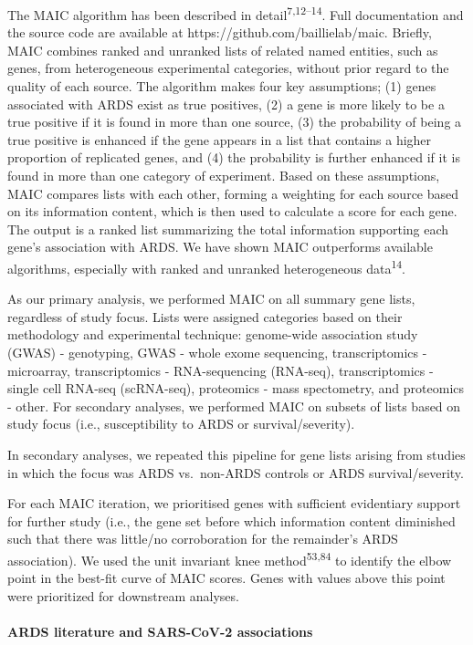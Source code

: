 \documentclass[
  11,
  a4paper,
]{article}
\let\oldparagraph\paragraph
\renewcommand{\paragraph}[1]{\oldparagraph{#1}\mbox{}}
\begin{document}
The MAIC algorithm has been described in
detail\textsuperscript{7,12--14}. Full documentation and the source code
are available at https://github.com/baillielab/maic. Briefly, MAIC
combines ranked and unranked lists of related named entities, such as
genes, from heterogeneous experimental categories, without prior regard
to the quality of each source. The algorithm makes four key assumptions;
(1) genes associated with ARDS exist as true positives, (2) a gene is
more likely to be a true positive if it is found in more than one
source, (3) the probability of being a true positive is enhanced if the
gene appears in a list that contains a higher proportion of replicated
genes, and (4) the probability is further enhanced if it is found in
more than one category of experiment. Based on these assumptions, MAIC
compares lists with each other, forming a weighting for each source
based on its information content, which is then used to calculate a
score for each gene. The output is a ranked list summarizing the total
information supporting each gene's association with ARDS. We have shown
MAIC outperforms available algorithms, especially with ranked and
unranked heterogeneous data\textsuperscript{14}.

As our primary analysis, we performed MAIC on all summary gene lists,
regardless of study focus. Lists were assigned categories based on their
methodology and experimental technique: genome-wide association study
(GWAS) - genotyping, GWAS - whole exome sequencing, transcriptomics -
microarray, transcriptomics - RNA-sequencing (RNA-seq), transcriptomics
- single cell RNA-seq (scRNA-seq), proteomics - mass spectometry, and
proteomics - other. For secondary analyses, we performed MAIC on subsets
of lists based on study focus (i.e., susceptibility to ARDS or
survival/severity).

In secondary analyses, we repeated this pipeline for gene lists arising
from studies in which the focus was ARDS vs.~non-ARDS controls or ARDS
survival/severity.

For each MAIC iteration, we prioritised genes with sufficient
evidentiary support for further study (i.e., the gene set before which
information content diminished such that there was little/no
corroboration for the remainder's ARDS association). We used the unit
invariant knee method\textsuperscript{53,84} to identify the elbow point
in the best-fit curve of MAIC scores. Genes with values above this point
were prioritized for downstream analyses.

\hypertarget{ards-literature-and-sars-cov-2-associations}{%
\paragraph{ARDS literature and SARS-CoV-2
associations}\label{ards-literature-and-sars-cov-2-associations}}
\end{document}
